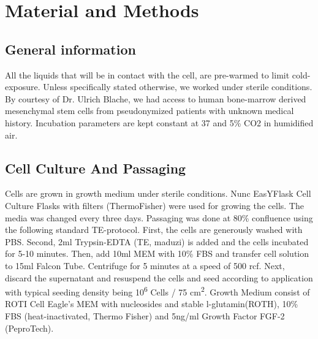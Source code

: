 \newcommand{\product}{\textit}

\chapter{Material and Methods}

\section{General information}
All the liquids that will be in contact with the cell, are pre-warmed to limit cold-exposure. Unless specifically stated otherwise, we worked under sterile conditions. By courtesy of Dr. Ulrich Blache, we had access to human bone-marrow derived mesenchymal stem cells from pseudonymized patients with unknown medical history. Incubation parameters are kept constant at 37 \degC{} and 5\% CO2 in humidified air.

\section{Cell Culture And Passaging}

Cells are grown in growth medium under sterile conditions. Nunc\texttrademark{} EasYFlask\texttrademark{} Cell Culture Flasks with filters (ThermoFisher) were used for growing the cells. The media was changed every three days. Passaging was done at 80\% confluence using the following standard TE-protocol. First, the cells are generously washed with PBS. Second, 2ml Trypsin-EDTA (TE, maduzi) is added and the cells incubated for 5-10 minutes. Then, add 10ml MEM\textalpha{} with 10\% FBS and transfer cell solution to 15ml Falcon Tube. Centrifuge for 5 minutes at a speed of 500 rcf. Next, discard the supernatant and resuspend the cells and seed according to application with typical seeding density being 10\textsuperscript{6} Cells / 75 cm\textsuperscript{2}. 
Growth Medium consist of ROTI\textregistered{} Cell Eagle's MEM\textalpha{} with nucleosides and stable l-glutamin(ROTH), 10\% FBS (heat-inactivated, Thermo Fisher) and 5ng/ml Growth Factor FGF-2 (PeproTech).

